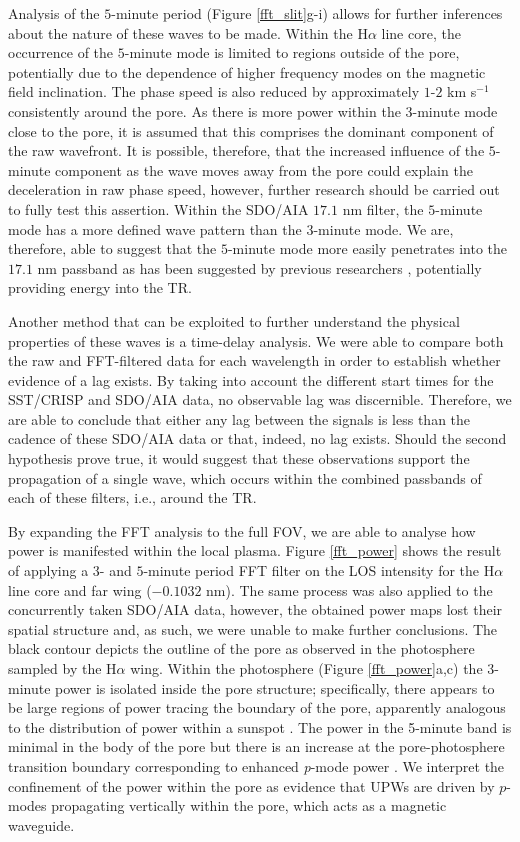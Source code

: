 	Analysis of the $5$-minute period (Figure \ref{fft_slit}g-i) allows for further inferences about the nature of these waves to be made.
	Within the H$\alpha$ line core, the occurrence of the $5$-minute mode is limited to regions outside of the pore, potentially due to the dependence of higher frequency modes on the magnetic field inclination\citep{DePontieu2004}.
	The phase speed is also reduced by approximately $1$-$2$ km s$^{-1}$ consistently around the pore.
	As there is more power within the $3$-minute mode close to the pore, it is assumed that this comprises the dominant component of the raw wavefront.
	It is possible, therefore, that the increased influence of the $5$-minute component as the wave moves away from the pore could explain the deceleration in raw phase speed, however, further research should be carried out to fully test this assertion.
	Within the SDO/AIA $17.1$ nm filter, the $5$-minute mode has a more defined wave pattern than the $3$-minute mode.
	We are, therefore, able to suggest that the $5$-minute mode more easily penetrates into the $17.1$ nm passband as has been suggested by previous researchers \citep{Moortel2002}, potentially providing energy into the TR.

	Another method that can be exploited to further understand the physical properties of these waves is a time-delay analysis.
	We were able to compare both the raw and FFT-filtered data for each wavelength in order to establish whether evidence of a lag exists.
	By taking into account the different start times for the SST/CRISP and SDO/AIA data, no observable lag was discernible.
	Therefore, we are able to conclude that either any lag between the signals is less than the cadence of these SDO/AIA data or that, indeed, no lag exists.
	Should the second hypothesis prove true, it would suggest that these observations support the propagation of a single wave, which occurs within the combined passbands of each of these filters, i.e., around the TR.

	By expanding the FFT analysis to the full FOV, we are able to analyse how power is manifested within the local plasma.
	Figure \ref{fft_power} shows the result of applying a $3$- and $5$-minute period FFT filter on the LOS intensity for the H$\alpha$ line core and far wing ($-0.1032$ nm).
	The same process was also applied to the concurrently taken SDO/AIA data, however, the obtained power maps lost their spatial structure and, as such, we were unable to make further conclusions.
	The black contour depicts the outline of the pore as observed in the photosphere sampled by the H$\alpha$ wing.
	Within the photosphere (Figure \ref{fft_power}a,c) the 3-minute power is isolated inside the pore structure; specifically, there appears to be large regions of power tracing the boundary of the pore, apparently analogous to the distribution of power within a sunspot \citep{Stangalini2012,Reznikova2012}.
	The power in the 5-minute band is minimal in the body of the pore but there is an increase at the pore-photosphere transition boundary corresponding to enhanced \textit{p}-mode power \citep{Mathew2008}.
    We interpret the confinement of the power within the pore as evidence that UPWs are driven by $p$-modes propagating vertically within the pore, which acts as a magnetic waveguide.


